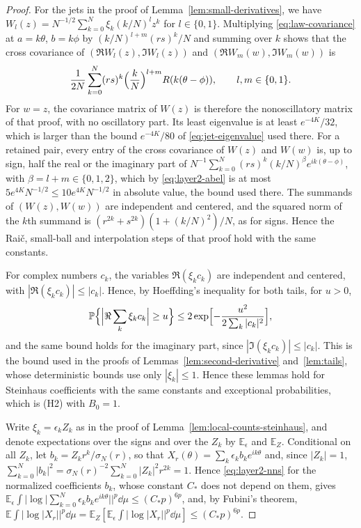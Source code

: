 \begin{proof}
For the jets in the proof of Lemma~\ref{lem:small-derivatives}, we have
$W_l(z)=N^{-1/2}\sum_{k=0}^N\xi_k(k/N)^lz^k$ for $l\in\{0,1\}$.
Multiplying \eqref{eq:law-covariance} at $a=k\theta$, $b=k\phi$ by
$(k/N)^{l+m}(rs)^k/N$ and summing over $k$ shows that the cross
covariance of $(\Re W_l(z),\allowbreak\Im W_l(z))$ and
$(\Re W_m(w),\allowbreak\Im W_m(w))$ is
\[
 \frac1{2N}\sum_{k=0}^N(rs)^k\Bigl(\frac kN\Bigr)^{l+m}R(k(\theta-\phi)),
 \qquad l,m\in\{0,1\}.
\]
For $w=z$, the covariance matrix of $W(z)$ is therefore the
nonoscillatory matrix of that proof, with no oscillatory part.
Its least eigenvalue is at least $e^{-4K}/32$, which is larger
than the bound $e^{-4K}/80$ of \eqref{eq:jet-eigenvalue} used there.
For a retained pair, every entry of the cross covariance of $W(z)$ and
$W(w)$ is, up to sign, half the real or the imaginary part of
$N^{-1}\sum_{k=0}^N(rs)^k(k/N)^\beta e^{ik(\theta-\phi)}$, with
$\beta=l+m\in\{0,1,2\}$, which by \eqref{eq:layer2-abel} is at most
$5e^{4K}N^{-1/2}\le10e^{4K}N^{-1/2}$ in absolute value, the
bound used there.
The summands of $(W(z),W(w))$ are independent and centered, and the
squared norm of the $k$th summand is $(r^{2k}+s^{2k})(1+(k/N)^2)/N$, as
for signs. Hence the Rai\v{c}, small-ball and interpolation steps of that
proof hold with the same constants.

For complex numbers $c_k$, the variables $\Re(\xi_kc_k)$ are independent
and centered, with $|\Re(\xi_kc_k)|\le|c_k|$. Hence, by Hoeffding's
inequality \cite[Theorem~2]{Hoeffding1963} for both tails, for $u>0$,
\[
 \mathbb P\Bigl\{\Bigl|\Re\sum_k\xi_kc_k\Bigr|\ge u\Bigr\}
 \le2\exp\Bigl[-\frac{u^2}{2\sum_k|c_k|^2}\Bigr],
\]
and the same bound holds for the imaginary part, since
$|\Im(\xi_kc_k)|\le|c_k|$.
This is the bound used in the proofs of Lemmas~\ref{lem:second-derivative}
and~\ref{lem:tails}, whose deterministic bounds use only $|\xi_k|\le1$.
Hence these lemmas hold for Steinhaus coefficients with the same
constants and exceptional probabilities, which is (H2) with $B_0=1$.

Write $\xi_k=\epsilon_kZ_k$ as in the proof of
Lemma~\ref{lem:local-counts-steinhaus}, and
denote expectations over the signs and over the $Z_k$ by
$\mathbb E_\epsilon$ and $\mathbb E_Z$.
Conditional on all $Z_k$, let $b_k=Z_kr^k/\sigma_N(r)$, so that
$X_r(\theta)=\sum_k\epsilon_kb_ke^{ik\theta}$ and, since $|Z_k|=1$,
$\sum_{k=0}^N|b_k|^2=\sigma_N(r)^{-2}\sum_{k=0}^N|Z_k|^2r^{2k}=1$.
Hence \eqref{eq:layer2-nns} for the normalized coefficients $b_k$, whose
constant $C_*$ does not depend on them, gives
$\mathbb E_\epsilon\int|\log|\sum_{k=0}^N\epsilon_kb_ke^{ik\theta}||^p\dd\mu
 \le(C_*p)^{6p}$,
and, by Fubini's theorem,
$\mathbb E\int|\log|X_r||^p\dd\mu
 =\mathbb E_Z[\mathbb E_\epsilon\int|\log|X_r||^p\dd\mu]
 \le(C_*p)^{6p}$.


\end{proof}
